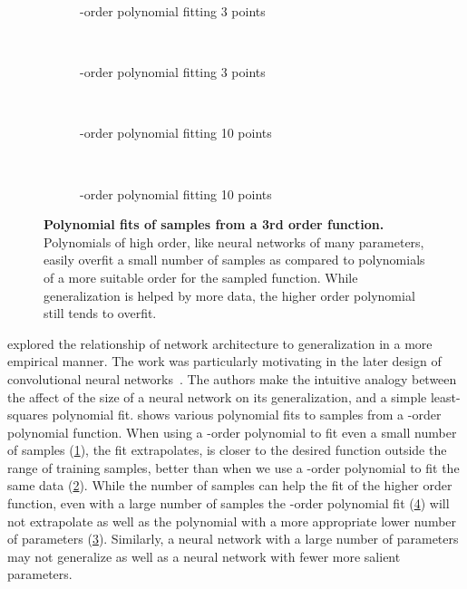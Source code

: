 \documentclass[thesis]{subfiles}
\begin{document}
	\begin{figure}[tb]
		\centering
		\begin{subfigure}[t]{0.49\textwidth}
			\resizebox{\linewidth}{!}{}
			\caption{-order polynomial fitting 3 points}
			\label{fig:polyfit3rd}
		\end{subfigure}
		~
		\begin{subfigure}[t]{0.49\textwidth}
			\resizebox{\linewidth}{!}{}
			\caption{-order polynomial fitting 3 points}
			\label{fig:polyfit20th}
		\end{subfigure}\\	
		\begin{subfigure}[t]{0.49\textwidth}
			\resizebox{\linewidth}{!}{}
			\caption{-order polynomial fitting 10 points}
			\label{fig:polyfit3rdlots}
		\end{subfigure}
		~
		\begin{subfigure}[t]{0.49\textwidth}
			\resizebox{\linewidth}{!}{}
			\caption{-order polynomial fitting 10 points}
			\label{fig:polyfit20thlots}
		\end{subfigure}
		\caption[Polynomial fits of samples from a 3rd order function.]{\textbf{Polynomial fits of samples from a 3rd order function.} Polynomials of high order, like neural networks of many parameters, easily overfit a small number of samples as compared to polynomials of a more suitable order for the sampled function. While generalization is helped by more data, the higher order polynomial still tends to overfit.}
		\label{fig:polyfits}
	\end{figure}

	\citet{denker1987large} explored the relationship of network architecture to generalization in a more empirical manner. The work was particularly motivating in the later design of convolutional neural networks~\citep{lecun1989generalization, lecun1989backpropagation}. The authors make the intuitive analogy between the affect of the size of a neural network on its generalization, and a simple least-squares polynomial fit.  shows various polynomial fits to samples from a -order polynomial function. When using a -order polynomial to fit even a small number of samples (\cref{fig:polyfit3rd}), the fit extrapolates, \ie is closer to the desired function outside the range of training samples, better than when we use a -order polynomial to fit the same data (\cref{fig:polyfit20th}). While the number of samples can help the fit of the higher order function, even with a large number of samples the -order polynomial fit  (\cref{fig:polyfit20thlots}) will not extrapolate as well as the polynomial with a more appropriate lower number of parameters (\cref{fig:polyfit3rdlots}). Similarly, a neural network with a large number of parameters may not generalize as well as a neural network with fewer more salient parameters.
    
\end{document}
